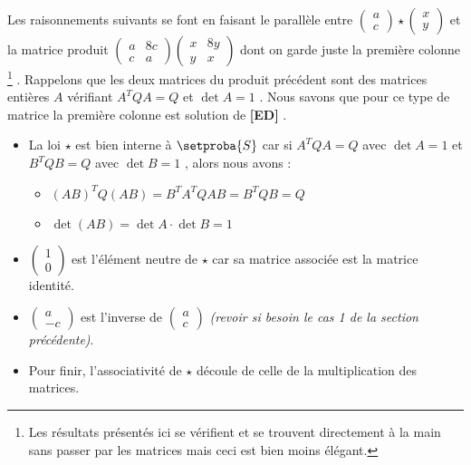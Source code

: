 \medskip

Les raisonnements suivants se font en faisant le parallèle entre 
$\begin{pmatrix} 
  a \\ 
  c 
\end{pmatrix}
\star
\begin{pmatrix} 
  x \\ 
  y 
\end{pmatrix}$
et la matrice produit
$\begin{pmatrix} 
  a & 8c \\ 
  c & a 
\end{pmatrix}
\begin{pmatrix} 
  x & 8y \\ 
  y & x 
\end{pmatrix}$
dont on garde juste la première colonne
\footnote{
	Les résultats présentés ici se vérifient et se trouvent directement à la main sans passer par les matrices mais ceci est bien moins élégant.
} .
Rappelons que les deux matrices du produit précédent sont des matrices entières $A$ vérifiant $A^T Q A = Q$ et $\det A = 1$ . Nous savons que pour ce type de matrice la première colonne est solution de \textbf{[ED]} .


\begin{itemize}[label=\small\textbullet]
	\item La loi $\star$ est bien interne à $\setproba{S}$ car si $A^T Q A = Q$ avec $\det A = 1$ et $B^T Q B = Q$ avec $\det B = 1$ , alors nous avons :
	
	\begin{itemize}[label=\raisebox{.3ex}{$\centerdot$}]
		\item $(AB)^T Q (AB) = B^T A^T Q A B = B^T Q B = Q$
		
		\medskip
		\item $\det(AB) = \det A \cdot \det B = 1$
	\end{itemize}


	\medskip
	\item
	$\begin{pmatrix} 
	  1 \\ 
	  0 
	\end{pmatrix}$
	est l'élément neutre de $\star$ car sa matrice associée est la matrice identité.


	\medskip
	\item
	$\begin{pmatrix} 
	  a  \\ 
	  -c 
	\end{pmatrix}$
	est l'inverse de
	$\begin{pmatrix} 
	  a \\ 
	  c 
	\end{pmatrix}$
	\textit{(revoir si besoin le cas 1 de la section précédente)}.


	\medskip
	\item Pour finir, l'associativité de $\star$ découle de celle de la multiplication des matrices.
\end{itemize}
